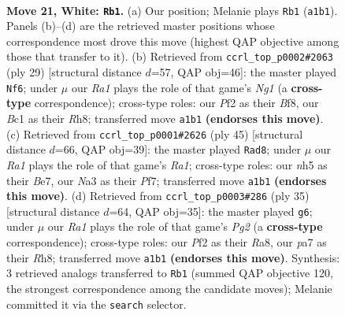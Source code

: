 \documentclass[11pt]{article}
\begin{document}
\clearpage

\begin{figure}[p]\centering
\begin{subfigure}{0.46\textwidth}\centering
\resizebox{\linewidth}{!}{%
\newchessgame
\chessboard[
  setfen={1rb2r2/pp4k1/6pp/2pBb2n/4p2P/N5P1/PP1PKP2/R1B1R3 w - - 0 21},
  showmover=false,
  pgfstyle=straightmove, color=movearrow, markmove={a1-b1}
]}
\caption{}
\end{subfigure}\hfill
\begin{subfigure}{0.46\textwidth}\centering
\resizebox{\linewidth}{!}{%
\newchessgame
\chessboard[
  setfen={2r1kbnr/1b1p1pp1/p3p3/7p/Pp1BPP2/3B4/NPP3PP/1K1RR3 b k - 1 15},
  showmover=false,
  pgfstyle=straightmove, color=movearrow, markmove={g8-f6}
]}
\caption{}
\end{subfigure}
\\[4pt]
\begin{subfigure}{0.46\textwidth}\centering
\resizebox{\linewidth}{!}{%
\newchessgame
\chessboard[
  setfen={r3r1k1/4bpp1/b1p4p/pp6/4PN1P/Pn3PP1/1P4K1/1R1RBB2 b - - 2 23},
  showmover=false,
  pgfstyle=straightmove, color=movearrow, markmove={a8-d8}
]}
\caption{}
\end{subfigure}\hfill
\begin{subfigure}{0.46\textwidth}\centering
\resizebox{\linewidth}{!}{%
\newchessgame
\chessboard[
  setfen={r6r/1p2kpp1/p2bb3/3pn2p/1P1N3P/2P3B1/1P2BPP1/R3K2R b KQ - 1 18},
  showmover=false,
  pgfstyle=straightmove, color=movearrow, markmove={g7-g6}
]}
\caption{}
\end{subfigure}
\caption{\textbf{Move 21, White: \texttt{Rb1}.} (a) Our position; Melanie plays \texttt{Rb1} (\texttt{a1b1}). Panels (b)--(d) are the retrieved master positions whose correspondence most drove this move (highest QAP objective among those that transfer to it). (b) Retrieved from \texttt{ccrl\_top\_p0002\#2063} (ply 29) [structural distance $d$=57, QAP obj=46]: the master played \texttt{Nf6}; under $\mu$ our \emph{Ra1} plays the role of that game's \emph{Ng1} (a \textbf{cross-type} correspondence); cross-type roles: our \emph{P}f2 as their \emph{B}f8, our \emph{B}c1 as their \emph{R}h8; transferred move \texttt{a1b1} \textbf{(endorses this move)}. (c) Retrieved from \texttt{ccrl\_top\_p0001\#2626} (ply 45) [structural distance $d$=66, QAP obj=39]: the master played \texttt{Rad8}; under $\mu$ our \emph{Ra1} plays the role of that game's \emph{Ra1}; cross-type roles: our \emph{n}h5 as their \emph{B}e7, our \emph{N}a3 as their \emph{P}f7; transferred move \texttt{a1b1} \textbf{(endorses this move)}. (d) Retrieved from \texttt{ccrl\_top\_p0003\#286} (ply 35) [structural distance $d$=64, QAP obj=35]: the master played \texttt{g6}; under $\mu$ our \emph{Ra1} plays the role of that game's \emph{Pg2} (a \textbf{cross-type} correspondence); cross-type roles: our \emph{P}f2 as their \emph{R}a8, our \emph{p}a7 as their \emph{R}h8; transferred move \texttt{a1b1} \textbf{(endorses this move)}. Synthesis: 3 retrieved analogs transferred to \texttt{Rb1} (summed QAP objective 120, the strongest correspondence among the candidate moves); Melanie committed it via the \texttt{search} selector.}
\label{fig:thought-m40}
\end{figure}
\end{document}
